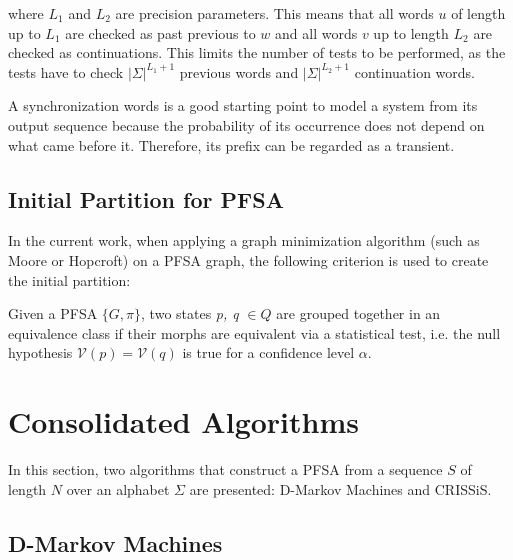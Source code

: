 {\noindent where $L_1$ and $L_2$ are precision parameters. This means that all words $u$ of length up to $L_1$ are checked as past previous to $w$ and all words $v$ up to length $L_2$ are checked as continuations. This limits the number of tests to be performed, as the tests have to check $|\Sigma|^{L_1 + 1}$ previous words and $|\Sigma|^{L_2+1}$ continuation words.


A synchronization words is a good starting point to model a system from its output sequence because the probability of its occurrence does not depend on what came before it. Therefore, its prefix can be regarded as a transient.

\subsection{Initial Partition for PFSA}\label{subsec:inipart}

In the current work, when applying a graph minimization algorithm (such as Moore or Hopcroft) on a PFSA graph, the following criterion is used to create the initial partition:

\begin{definition}\label{def:inipartpfsa}

Given a PFSA $\{G,\pi\}$, two states \textit{p, q} $\in Q$ are grouped together in an equivalence class if their morphs are equivalent via a statistical test, i.e. the null hypothesis $\mathcal{V}(p) = \mathcal{V}(q)$ is true for a confidence level $\alpha$.

\end{definition}



\section{Consolidated Algorithms}

In this section, two algorithms that construct a PFSA from a sequence $S$ of length $N$ over an alphabet $\Sigma$ are presented: D-Markov Machines and CRISSiS.

\subsection{D-Markov Machines}

}
